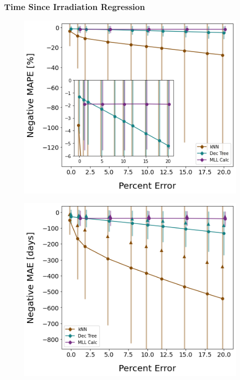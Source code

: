 \begin{frame}
  \frametitle{Time Since Irradiation Regression}
  \begin{adjustwidth}{-15pt}{0pt}
  \begin{minipage}{0.5\textwidth}
    \begin{figure}
      \centering
      \includegraphics[width=\textwidth]{./figures/randerr_compare_nuc29_MAPE_cool.png}
    \end{figure}
  \end{minipage}%
  \hfill
  \begin{minipage}{0.5\textwidth}
    \begin{figure}
      \centering
      \includegraphics[width=\textwidth]{./figures/randerr_compare_nuc29_MAE_cool.png}
    \end{figure}
  \end{minipage}
  \end{adjustwidth}
\end{frame}

